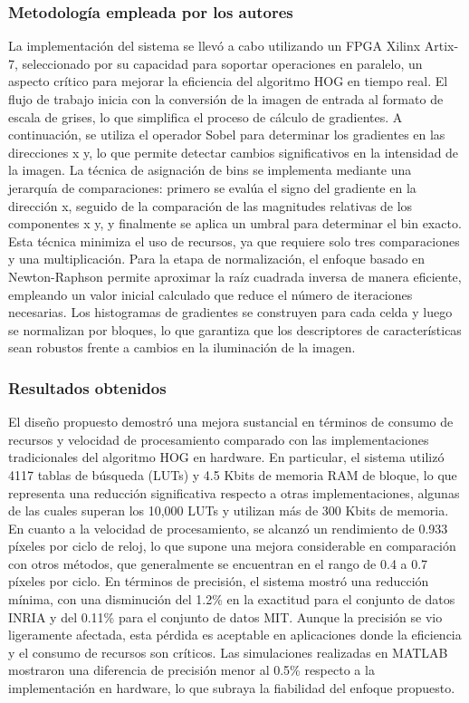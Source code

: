 \subsubsection{Metodología empleada por los autores}
La implementación del sistema se llevó a cabo utilizando un FPGA Xilinx Artix-7, seleccionado por su capacidad para soportar operaciones en paralelo, un aspecto crítico para mejorar la eficiencia del algoritmo HOG en tiempo real. El flujo de trabajo inicia con la conversión de la imagen de entrada al formato de escala de grises, lo que simplifica el proceso de cálculo de gradientes. A continuación, se utiliza el operador Sobel para determinar los gradientes en las direcciones 
 x y, lo que permite detectar cambios significativos en la intensidad de la imagen. La técnica de asignación de bins se implementa mediante una jerarquía de comparaciones: primero se evalúa el signo del gradiente en la dirección x, seguido de la comparación de las magnitudes relativas de los componentes x y, y finalmente se aplica un umbral para determinar el bin exacto. Esta técnica minimiza el uso de recursos, ya que requiere solo tres comparaciones y una multiplicación. Para la etapa de normalización, el enfoque basado en Newton-Raphson permite aproximar la raíz cuadrada inversa de manera eficiente, empleando un valor inicial calculado que reduce el número de iteraciones necesarias. Los histogramas de gradientes se construyen para cada celda y luego se normalizan por bloques, lo que garantiza que los descriptores de características sean robustos frente a cambios en la iluminación de la imagen.


\subsubsection{Resultados obtenidos}
El diseño propuesto demostró una mejora sustancial en términos de consumo de recursos y velocidad de procesamiento comparado con las implementaciones tradicionales del algoritmo HOG en hardware. En particular, el sistema utilizó 4117 tablas de búsqueda (LUTs) y 4.5 Kbits de memoria RAM de bloque, lo que representa una reducción significativa respecto a otras implementaciones, algunas de las cuales superan los 10,000 LUTs y utilizan más de 300 Kbits de memoria. En cuanto a la velocidad de procesamiento, se alcanzó un rendimiento de 0.933 píxeles por ciclo de reloj, lo que supone una mejora considerable en comparación con otros métodos, que generalmente se encuentran en el rango de 0.4 a 0.7 píxeles por ciclo. En términos de precisión, el sistema mostró una reducción mínima, con una disminución del 1.2\% en la exactitud para el conjunto de datos INRIA y del 0.11\% para el conjunto de datos MIT. Aunque la precisión se vio ligeramente afectada, esta pérdida es aceptable en aplicaciones donde la eficiencia y el consumo de recursos son críticos. Las simulaciones realizadas en MATLAB mostraron una diferencia de precisión menor al 0.5\% respecto a la implementación en hardware, lo que subraya la fiabilidad del enfoque propuesto.


